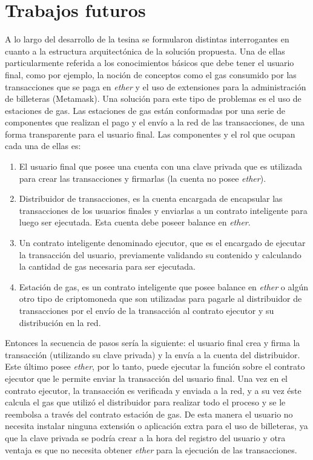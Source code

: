 \section{Trabajos futuros}
\label{future_works}

A lo largo del desarrollo de la tesina se formularon distintas interrogantes en cuanto a la estructura arquitectónica de la solución propuesta. Una de ellas particularmente referida a los conocimientos básicos que debe tener el usuario final, como por ejemplo, la noción de conceptos como el gas consumido por las transacciones que se paga en \textit{ether} y el uso de extensiones para la administración de billeteras (Metamask). Una solución para este tipo de problemas es el uso de estaciones de gas. Las estaciones de gas están conformadas por una serie de componentes que realizan el pago y el envío a la red de las transacciones, de una forma transparente para el usuario final. Las componentes y el rol que ocupan cada una de ellas es:

\begin{enumerate}
  \item El usuario final que posee una cuenta con una clave privada que es utilizada para crear las transacciones y firmarlas (la cuenta no posee \textit{ether}).
  \item Distribuidor de transacciones, es la cuenta encargada de encapsular las transacciones de los usuarios finales y enviarlas a un contrato inteligente para luego ser ejecutada. Esta cuenta debe poseer balance en \textit{ether}.
  \item Un contrato inteligente denominado ejecutor, que es el encargado de ejecutar la transacción del usuario, previamente validando su contenido y calculando la cantidad de gas necesaria para ser ejecutada.
  \item Estación de gas, es un contrato inteligente que posee balance en \textit{ether} o algún otro tipo de criptomoneda que son utilizadas para pagarle al distribuidor de transacciones por el envío de la transacción al contrato ejecutor y su distribución en la red.
\end{enumerate}

Entonces la secuencia de pasos sería la siguiente: el usuario final crea y firma la transacción (utilizando su clave privada) y la envía a la cuenta del distribuidor. Este último posee \textit{ether}, por lo tanto, puede ejecutar la función sobre el contrato ejecutor que le permite enviar la transacción del usuario final. Una vez en el contrato ejecutor, la transacción es verificada y enviada a la red, y a su vez éste calcula el gas que utilizó el distribuidor para realizar todo el proceso y se le reembolsa a través del contrato estación de gas.
De esta manera el usuario no necesita instalar ninguna extensión o aplicación extra para el uso de billeteras, ya que la clave privada se podría crear a la hora del registro del usuario y otra ventaja es que no necesita obtener \textit{ether} para la ejecución de las transacciones.

